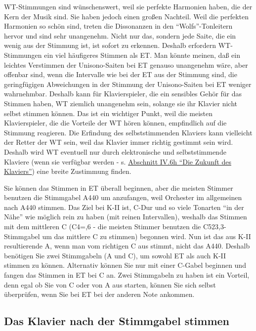 WT-Stimmungen sind wünschenswert, weil sie perfekte Harmonien haben, die der Kern der Musik sind.
 Sie haben jedoch einen großen Nachteil.
 Weil die perfekten Harmonien so schön sind, treten die Dissonanzen in den \enquote{Wolfs}-Tonleitern hervor und sind sehr unangenehm.
 Nicht nur das, sondern jede Saite, die ein wenig aus der Stimmung ist, ist sofort zu erkennen.
 Deshalb erfordern WT-Stimmungen ein viel häufigeres Stimmen als ET.
 Man könnte meinen, daß ein leichtes Verstimmen der Unisono-Saiten bei ET genauso unangenehm wäre, aber offenbar sind, wenn die Intervalle wie bei der ET aus der Stimmung sind, die geringfügigen Abweichungen in der Stimmung der Unisono-Saiten bei ET weniger wahrnehmbar.
 Deshalb kann für Klavierspieler, die ein sensibles Gehör für das Stimmen haben, WT ziemlich unangenehm sein, solange sie ihr Klavier nicht selbst stimmen können.
 Das ist ein wichtiger Punkt, weil die meisten Klavierspieler, die die Vorteile der WT hören können, empfindlich auf die Stimmung reagieren.
 Die Erfindung des selbststimmenden Klaviers kann vielleicht der Retter der WT sein, weil das Klavier immer richtig gestimmt sein wird.
 Deshalb wird WT eventuell nur durch elektronische und selbststimmende Klaviere (wenn sie verfügbar werden - s. \hyperlink{c1iv6h}{Abschnitt IV.6h \enquote{Die Zukunft des Klaviers}}) eine breite Zustimmung finden.
 

Sie können das Stimmen in ET überall beginnen, aber die meisten Stimmer benutzen die Stimmgabel A440 um anzufangen, weil Orchester im allgemeinen nach A440 stimmen.
 Das Ziel bei K-II ist, C-Dur und so viele Tonarten \enquote{in der Nähe} wie möglich rein zu haben (mit reinen Intervallen), weshalb das Stimmen mit dem mittleren C (C4\nolinebreak=,6 - die meisten Stimmer benutzen die C523,3-Stimmgabel um das mittlere C zu stimmen) begonnen wird.
 Nun ist das aus K-II resultierende A, wenn man vom richtigen C aus stimmt, nicht das A440.
 Deshalb benötigen Sie zwei Stimmgabeln (A und C), um sowohl ET als auch K-II stimmen zu können.
 Alternativ können Sie nur mit einer C-Gabel beginnen und fangen das Stimmen in ET bei C an.
 Zwei Stimmgabeln zu haben ist ein Vorteil, denn egal ob Sie von C oder von A aus starten, können Sie sich selbst überprüfen, wenn Sie bei ET bei der anderen Note ankommen.
 \hypertarget{c2_6b}{}\hypertarget{c2_6_gabe}{}

\subsection{Das Klavier nach der Stimmgabel stimmen}

